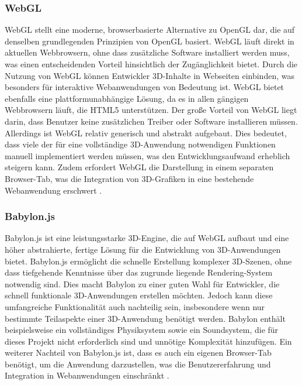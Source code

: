 \subsubsection{WebGL}
WebGL stellt eine moderne, browserbasierte Alternative zu OpenGL dar, die auf denselben grundlegenden Prinzipien von OpenGL basiert.
WebGL läuft direkt in aktuellen Webbrowsern, ohne dass zusätzliche Software installiert werden muss, was einen entscheidenden Vorteil hinsichtlich der Zugänglichkeit bietet.
Durch die Nutzung von WebGL können Entwickler 3D-Inhalte in Webseiten einbinden, was besonders für interaktive Webanwendungen von Bedeutung ist.
WebGL bietet ebenfalls eine plattformunabhängige Lösung, da es in allen gängigen Webbrowsern läuft, die HTML5 unterstützen. Der große Vorteil von WebGL liegt darin,
dass Benutzer keine zusätzlichen Treiber oder Software installieren müssen. Allerdings ist WebGL relativ generisch und abstrakt aufgebaut.
Dies bedeutet, dass viele der für eine vollständige 3D-Anwendung notwendigen Funktionen manuell implementiert werden müssen, was den Entwicklungsaufwand
erheblich steigern kann. Zudem erfordert WebGL die Darstellung in einem separaten Browser-Tab,
was die Integration von 3D-Grafiken in eine bestehende Webanwendung erschwert .

\subsubsection{Babylon.js}
Babylon.js ist eine leistungsstarke 3D-Engine, die auf WebGL aufbaut und eine höher abstrahierte, fertige Lösung für die Entwicklung von 3D-Anwendungen bietet.
Babylon.js ermöglicht die schnelle Erstellung komplexer 3D-Szenen, ohne dass tiefgehende Kenntnisse über das zugrunde liegende Rendering-System notwendig sind.
Dies macht Babylon zu einer guten Wahl für Entwickler, die schnell funktionale 3D-Anwendungen erstellen möchten.
Jedoch kann diese umfangreiche Funktionalität auch nachteilig sein, insbesondere wenn nur bestimmte Teilaspekte einer 3D-Anwendung benötigt werden.
Babylon enthält beispielsweise ein vollständiges Physiksystem sowie ein Soundsystem, die für dieses Projekt nicht erforderlich sind und unnötige Komplexität hinzufügen.
Ein weiterer Nachteil von Babylon.js ist, dass es auch ein eigenen Browser-Tab benötigt,
um die Anwendung darzustellen,
was die Benutzererfahrung und Integration in Webanwendungen einschränkt .

